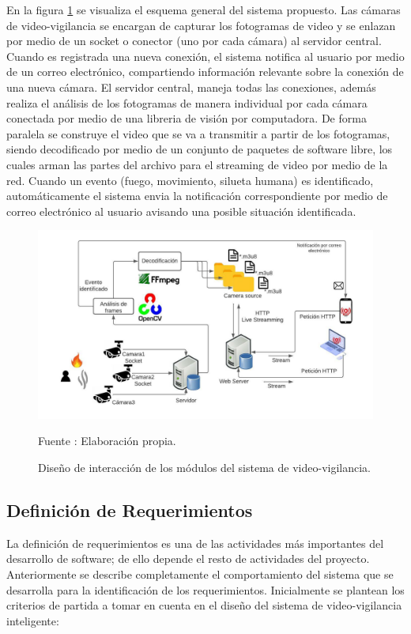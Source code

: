 En la figura \ref{fig:system_desing} se visualiza el esquema general del sistema propuesto. Las cámaras de video-vigilancia se encargan de capturar los fotogramas de video y se enlazan por medio de un socket o conector (uno por cada cámara) al servidor central. Cuando es registrada una nueva conexión, el sistema notifica al usuario por medio de un correo electrónico, compartiendo información relevante sobre la conexión de una nueva cámara. El servidor central, maneja todas las conexiones, además realiza el análisis de los fotogramas de manera individual por cada cámara conectada por medio de una libreria de visión por computadora. De forma paralela se construye el video que se va a transmitir a partir de los fotogramas, siendo decodificado por medio de un conjunto de paquetes de software libre, los cuales arman las partes del archivo para el streaming de video por medio de la red. Cuando un evento (fuego, movimiento, silueta humana) es identificado, automáticamente el sistema envia la notificación correspondiente por medio de correo electrónico al usuario avisando una posible situación identificada.\\

\begin{figure}[H]
    \begin{center}
        \includegraphics[width=17cm]{img/capitulo_4/main.jpeg}
        \caption{Diseño de interacción de los módulos del sistema de video-vigilancia.}
        Fuente : Elaboración propia.
        \label{fig:system_desing}
    \end{center}
\end{figure}

\subsection{Definición de Requerimientos}
La definición de requerimientos es una de las actividades más importantes del desarrollo de software; de ello depende el resto de actividades del proyecto. Anteriormente se describe completamente el comportamiento del sistema que se desarrolla para la identificación de los requerimientos. Inicialmente se plantean los criterios de partida a tomar en cuenta en el diseño del sistema de video-vigilancia inteligente:

